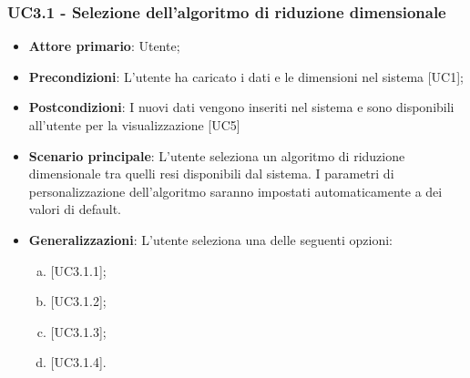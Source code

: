 \subsubsection{UC3.1 - Selezione dell'algoritmo di riduzione dimensionale}
\begin{itemize}
	\item \textbf{Attore primario}: Utente;
	\item \textbf{Precondizioni}: L'utente ha caricato i dati e le dimensioni nel sistema [UC1];
	\item \textbf{Postcondizioni}: I nuovi dati vengono inseriti nel sistema e sono disponibili all'utente per la visualizzazione [UC5]
	\item \textbf{Scenario principale}: L'utente seleziona un algoritmo di riduzione dimensionale tra quelli resi disponibili dal sistema. I parametri di personalizzazione dell'algoritmo saranno impostati automaticamente a dei valori di default.
	\item \textbf{Generalizzazioni}: L'utente seleziona una delle seguenti opzioni:
	\begin{enumerate}[(a)]
		\item {} [UC3.1.1];
		\item {} [UC3.1.2];
		\item {} [UC3.1.3];
		\item {} [UC3.1.4].
	\end{enumerate}
\end{itemize}